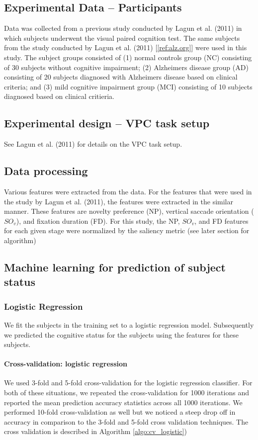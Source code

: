 \documentclass{article}  %
\begin{document}
\subsection{Experimental Data -- Participants}
Data was collected from a previous study conducted by Lagun et al. (2011) in which subjects underwent the visual paired cognition test. The same subjects from the study conducted by Lagun et al. (2011) [\ref{ref:alz.org}] were used in this study. The subject groups consisted of (1) normal controls group (NC) consisting of 30 subjects without cognitive impairment; (2) Alzheimers disease group (AD) consisting of 20 subjects diagnosed with Alzheimers disease based on clinical criteria; and (3) mild cognitive impairment group (MCI) consisting of 10 subjects diagnosed based on clinical critieria.

\subsection{Experimental design -- VPC task setup}
See Lagun et al. (2011) for details on the VPC task setup.

\subsection{Data processing}
Various features were extracted from the data. For the features that were used in the study by Lagun et al. (2011), the features were extracted in the similar manner. These features are novelty preference (NP), vertical saccade orientation ($SO_v$), and fixation duration (FD). For this study, the NP, $SO_v$, and FD features for each given stage were normalized by the saliency metric (see later section for algorithm) 


\subsection{Machine learning for prediction of subject status}

\subsubsection{Logistic Regression}
We fit the subjects in the training set to a logistic regression model. Subsequently we predicted the cognitive status for the subjects using the features for these subjects. 

\paragraph{Cross-validation: logistic regression}
We used 3-fold and 5-fold cross-validation for the logistic regression classifier. For both of these situations, we repeated the cross-validation for 1000 iterations and reported the mean prediction accuracy statistics across all 1000 iterations. We performed 10-fold cross-validation as well but we noticed a steep drop off in accuracy in comparison to the 3-fold and 5-fold cross validation techniques. The cross validation is described in Algorithm \ref{algo:cv_logistic})
\end{document}
